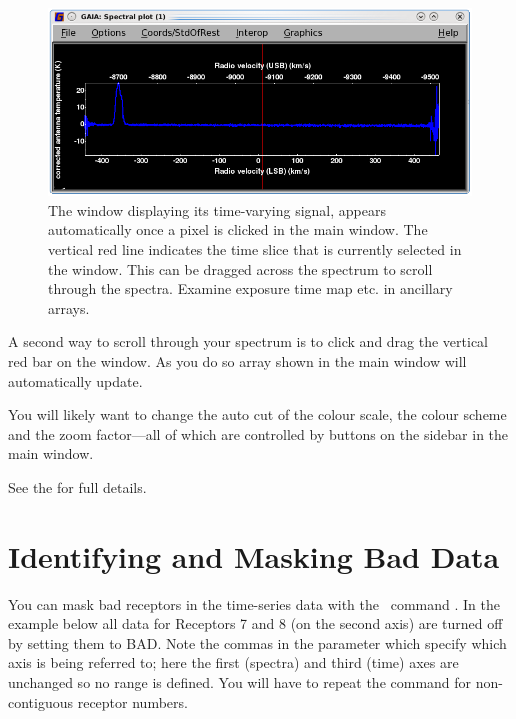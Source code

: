 \documentclass[11pt,oneside,chapters]{starlink}
\begin{document}
\begin{figure}[h!]
\begin{center}
\includegraphics[width=0.7\linewidth]{sc20_gaia2}
\caption[Spectral plot window with \gaia.]{\label{fig:gaia2}
  The  window displaying its time-varying
  signal, appears automatically once a pixel is clicked in the main window.
  The vertical red line indicates the time slice that is currently selected
  in the  window. This can be
  dragged across the spectrum to scroll through the spectra. Examine exposure
  time map etc. in ancillary arrays.}
\end{center}
\end{figure}



A second way to scroll through your spectrum is to click and drag the
vertical red bar on the  window. As you do so
array shown in the main window will automatically update.

You will likely want to change the auto cut of the colour scale, the
colour scheme and the zoom factor---all of which are controlled by
buttons on the sidebar in the main window.

See the  for full
details.

\section{Identifying and Masking Bad Data}
\label{sec:badrecs}

You can mask bad receptors in the time-series data with the \Kappa\
command \chpix. In the example below all data for Receptors 7 and 8
(on the second axis) are turned off by setting them to BAD. Note the
commas in the \param{SECTION} parameter which specify which axis is
being referred to; here the first (spectra) and third (time) axes are
unchanged so no range is defined. You will have to repeat the command
for non-contiguous receptor numbers.
\end{document}
